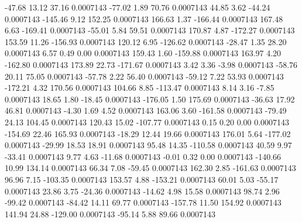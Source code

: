       -47.68       13.12       37.16     0.0007143
      -77.02        1.89       70.76     0.0007143
       44.85        3.62      -44.24     0.0007143
     -145.46        9.12      152.25     0.0007143
      166.63        1.37     -166.44     0.0007143
      167.48        6.63     -169.41     0.0007143
      -55.01        5.84       59.51     0.0007143
      170.87        4.87     -172.27     0.0007143
      153.59       11.26     -156.93     0.0007143
      120.12        6.95     -126.62     0.0007143
      -28.47        1.35       28.20     0.0007143
        6.57        0.49        0.00     0.0007143
      159.43        1.60     -159.88     0.0007143
      163.97        4.20     -162.80     0.0007143
      173.89       22.73     -171.67     0.0007143
        3.42        3.36       -3.98     0.0007143
      -58.76       20.11       75.05     0.0007143
      -57.78        2.22       56.40     0.0007143
      -59.12        7.22       53.93     0.0007143
     -172.21        4.32      170.56     0.0007143
      104.66        8.85     -113.47     0.0007143
        8.14        3.16       -7.85     0.0007143
       18.65        1.80      -18.45     0.0007143
     -176.05        1.50      175.69     0.0007143
      -36.63       17.92       46.81     0.0007143
       -4.30        1.69        4.52     0.0007143
      163.06        3.60     -161.58     0.0007143
      -79.49       24.13      104.45     0.0007143
      120.43       15.02     -107.77     0.0007143
        0.15        0.20        0.00     0.0007143
     -154.69       22.46      165.93     0.0007143
      -18.29       12.44       19.66     0.0007143
      176.01        5.64     -177.02     0.0007143
      -29.99       18.53       18.91     0.0007143
       95.48       14.35     -110.58     0.0007143
       40.59        9.97      -33.41     0.0007143
        9.77        4.63      -11.68     0.0007143
       -0.01        0.32        0.00     0.0007143
     -140.66       10.99      134.14     0.0007143
       66.34        7.08      -59.45     0.0007143
      162.30        2.85     -161.63     0.0007143
       96.96        7.15     -103.35     0.0007143
      153.57        4.88     -153.21     0.0007143
       60.01        5.03      -55.17     0.0007143
       23.86        3.75      -24.36     0.0007143
      -14.62        4.98       15.58     0.0007143
       98.74        2.96      -99.42     0.0007143
      -84.42       14.11       69.77     0.0007143
     -157.78       11.50      154.92     0.0007143
      141.94       24.88     -129.00     0.0007143
      -95.14        5.88       89.66     0.0007143
